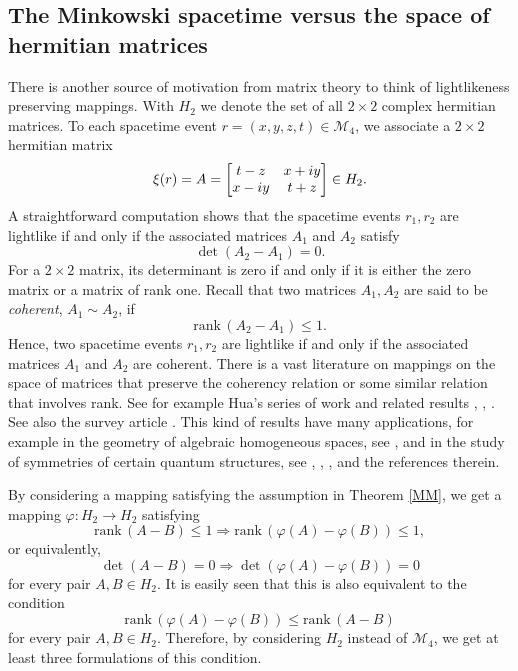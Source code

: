\documentclass[10pt]{amsart}
\theoremstyle{definition}
\theoremstyle{remark}
\numberwithin{subsection}{section}
\numberwithin{equation}{section}
\begin{document}
\subsection{The Minkowski spacetime versus the space of hermitian matrices}\label{vs}
There is another source of motivation from matrix theory to think of lightlikeness preserving mappings.
With $H_2$  we denote the set of all $2 \times 2$ complex hermitian matrices.
To each spacetime event $r = (x,y,z,t) \in \mathcal{M}_4$, we associate a $2\times 2$ hermitian matrix
\begin{equation}\label{zacet}\index{$xi$@$\xi$}
\xi(r)=A= \left[ \begin{matrix}  t-z & x+iy \cr x-iy & t+z \cr\end{matrix} \right]\in H_2. 
\end{equation}
A straightforward computation shows that the spacetime
events $r_1 , r_2$ are lightlike if and only if the associated matrices $A_1$ and $A_2$ satisfy
\[
\det (A_2 - A_1) = 0.
\]
For a $2\times 2$ matrix, its determinant is zero if and only if it is either the zero matrix or a matrix of rank one. Recall that two matrices
$A_1 , A_2$ are said to be \emph{coherent}, $A_1 \sim A_2$,  if
\[
\mathrm{rank}\, (A_2 - A_1 ) \le 1.
\]
Hence, two spacetime
events $r_1 , r_2$ are lightlike if and only if the associated matrices $A_1$ and $A_2$ are coherent.
There is a vast literature on mappings on the space of matrices that preserve the coherency relation or some similar relation that involves rank. 
See for example Hua's series of work \cite{Hu1,Hu2,Hu3,Hu4,Hu5,Hu6,Hu7,Hu8} and related results \cite{HuS}, \cite{SS}, \cite{Se3}. See also the survey article \cite{LP}. 
This kind of results have many applications, for example in the geometry of algebraic homogeneous spaces, see \cite{Cho}, and in the study of symmetries of certain quantum structures, see \cite{Mol}, \cite{Se1}, \cite{Se2}, and the references therein.

By considering a mapping satisfying the assumption in Theorem \ref{MM}, we get a mapping $\varphi\colon H_2\to H_2$ satisfying
\[
\mathrm{rank}\, (A - B ) \le 1 \Rightarrow \mathrm{rank}\, (\varphi(A) - \varphi(B))\leq 1,
\]
or equivalently, 
\begin{equation}\label{det}
\det (A - B ) = 0 \Rightarrow \det(\varphi(A) - \varphi(B))=0
\end{equation}
for every pair $A, B\in H_2$.
It is easily seen that this is also equivalent to the condition
\[
\mathrm{rank}\, (\varphi(A) - \varphi(B))\leq \mathrm{rank}\, (A - B )
\]
for every pair $A, B\in H_2$.
Therefore, by considering $H_2$ instead of $\mathcal{M}_4$, we get at least three formulations of this condition. 
\end{document}
